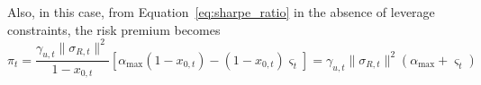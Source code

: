 \documentclass[12pt,english]{article}
\begin{document}
Also, in this case, from Equation~\eqref{eq:sharpe_ratio} in the absence of leverage constraints, the risk premium becomes
\[\pi_{t} =  \frac{\gamma_{u,t} \|\sigma_{R,t}\|^2}{1-x_{0,t}} \left[ \alpha_{\mathrm{max}}(1-x_{0,t}) - (1-x_{0,t}) \varsigma_{t}\right]=\gamma_{u,t} \|\sigma_{R,t}\|^2(\alpha_{\mathrm{max}}+\varsigma_{t})\]

\end{document}
